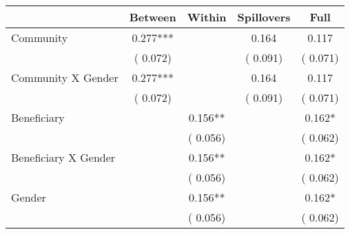 
\begin{tabular}{l*{4}{c}}\hline&\multicolumn{1}{c}{Between}&\multicolumn{1}{c}{Within}&\multicolumn{1}{c}{Spillovers}&\multicolumn{1}{c}{Full}\\ \hline
 Community                                     &              0.277***      &                                               &        0.164 &         0.117                            \\ 
                                                       &        (       0.072)           &                                       &       (       0.091)     &      (       0.071)                                           \\ 
 Community X Gender            &              0.277***      &                                               &        0.164 &         0.117                            \\ 
                                                       &        (       0.072)           &                                       &       (       0.091)     &      (       0.071)                                           \\ 
 Beneficiary                           &                                               &        0.156**    &                                &             0.162*                            \\ 
                                                       &                                               & (       0.056)                  &                                        &      (       0.062)                                           \\ 
 Beneficiary X Gender          &                                               &        0.156**    &                                &             0.162*                            \\ 
                                                       &                                               & (       0.056)                  &                                        &      (       0.062)                                           \\ 
 Gender                                        &                              &        0.156**    &                                &             0.162*                            \\ 
                                                       &                                               & (       0.056)                  &                                        &      (       0.062)                                           \\ 

\end{tabular}
